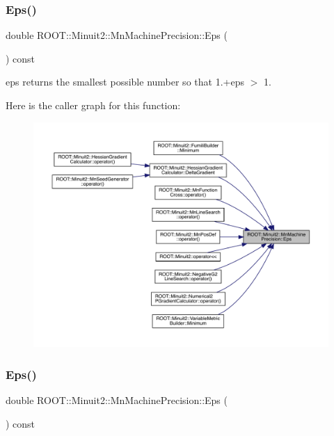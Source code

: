 \subsubsection{\texorpdfstring{Eps()}{Eps()}\hspace{0.1cm}{\footnotesize\ttfamily [1/2]}}
{\footnotesize\ttfamily double R\+O\+O\+T\+::\+Minuit2\+::\+Mn\+Machine\+Precision\+::\+Eps (\begin{DoxyParamCaption}{ }\end{DoxyParamCaption}) const\hspace{0.3cm}{\ttfamily [inline]}}



eps returns the smallest possible number so that 1.+eps $>$ 1. 

Here is the caller graph for this function\+:\nopagebreak
\begin{figure}[H]
\begin{center}
\leavevmode
\includegraphics[width=350pt]{d4/d40/classROOT_1_1Minuit2_1_1MnMachinePrecision_a3a56da6043c5df1a98e5c8b1aa9f6d9f_icgraph}
\end{center}
\end{figure}
\mbox{\label{classROOT_1_1Minuit2_1_1MnMachinePrecision_a3a56da6043c5df1a98e5c8b1aa9f6d9f}} 
\subsubsection{\texorpdfstring{Eps()}{Eps()}\hspace{0.1cm}{\footnotesize\ttfamily [2/2]}}
{\footnotesize\ttfamily double R\+O\+O\+T\+::\+Minuit2\+::\+Mn\+Machine\+Precision\+::\+Eps (\begin{DoxyParamCaption}{ }\end{DoxyParamCaption}) const\hspace{0.3cm}{\ttfamily [inline]}}



